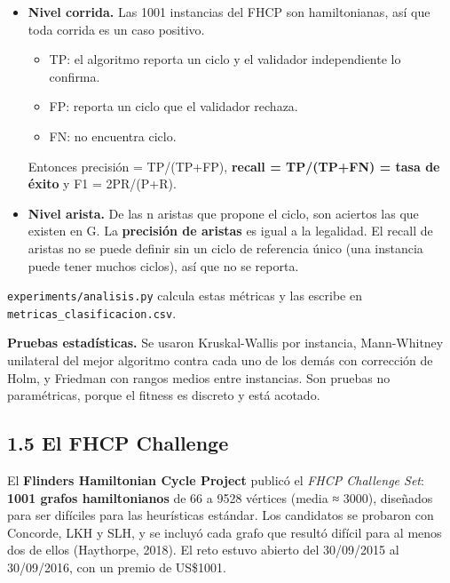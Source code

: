\documentclass[
  spanish,
  11pt,
]{article}
\providecommand{\tightlist}{%
  \setlength{\itemsep}{0pt}\setlength{\parskip}{0pt}}
\begin{document}
\begin{itemize}
\tightlist
\item
  \textbf{Nivel corrida.} Las 1001 instancias del FHCP son
  hamiltonianas, así que toda corrida es un caso positivo.

  \begin{itemize}
  \tightlist
  \item
    TP: el algoritmo reporta un ciclo y el validador independiente lo
    confirma.
  \item
    FP: reporta un ciclo que el validador rechaza.
  \item
    FN: no encuentra ciclo.
  \end{itemize}

  Entonces precisión = TP/(TP+FP), \textbf{recall = TP/(TP+FN) = tasa de
  éxito} y F1 = 2PR/(P+R).
\item
  \textbf{Nivel arista.} De las n aristas que propone el ciclo, son
  aciertos las que existen en G. La \textbf{precisión de aristas} es
  igual a la legalidad. El recall de aristas no se puede definir sin un
  ciclo de referencia único (una instancia puede tener muchos ciclos),
  así que no se reporta.
\end{itemize}

\texttt{experiments/analisis.py} calcula estas métricas y las escribe en
\texttt{metricas\_clasificacion.csv}.

\textbf{Pruebas estadísticas.} Se usaron Kruskal-Wallis por instancia,
Mann-Whitney unilateral del mejor algoritmo contra cada uno de los demás
con corrección de Holm, y Friedman con rangos medios entre instancias.
Son pruebas no paramétricas, porque el fitness es discreto y está
acotado.

\subsection{1.5 El FHCP Challenge}\label{el-fhcp-challenge}

El \textbf{Flinders Hamiltonian Cycle Project} publicó el \emph{FHCP
Challenge Set}: \textbf{1001 grafos hamiltonianos} de 66 a 9528 vértices
(media ≈ 3000), diseñados para ser difíciles para las heurísticas
estándar. Los candidatos se probaron con Concorde, LKH y SLH, y se
incluyó cada grafo que resultó difícil para al menos dos de ellos
(Haythorpe, 2018). El reto estuvo abierto del 30/09/2015 al 30/09/2016,
con un premio de US\$1001.
\end{document}
